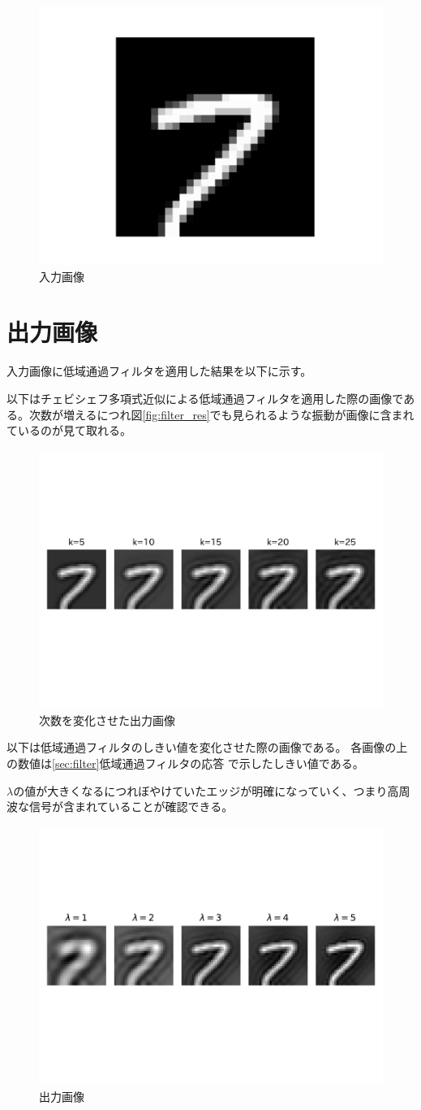\begin{figure}[h]
  \centering
  \includegraphics[width=0.3\linewidth]{fig/base_image.pdf}
  \caption{入力画像}
  \label{fig:inputs}
\end{figure}

\section{出力画像}
入力画像に低域通過フィルタを適用した結果を以下に示す。

以下はチェビシェフ多項式近似による低域通過フィルタを適用した際の画像である。次数が増えるにつれ図\ref{fig:filter_res}でも見られるような振動が画像に含まれているのが見て取れる。

\begin{figure}[h]
  \centering
  \includegraphics[width=0.7\linewidth]{fig/output_crop.pdf}
  \caption{次数を変化させた出力画像}
  \label{fig:outputs}
\end{figure}


以下は低域通過フィルタのしきい値を変化させた際の画像である。
各画像の上の数値は\ref{sec:filter}低域通過フィルタの応答 で示したしきい値である。

$\lambda$の値が大きくなるにつれぼやけていたエッジが明確になっていく、つまり高周波な信号が含まれていることが確認できる。
\begin{figure}[h]
  \centering
  \includegraphics[width=0.7\linewidth]{fig/thershold_crop.pdf}
  \caption{出力画像}
  \label{fig:thresholds}
\end{figure}

